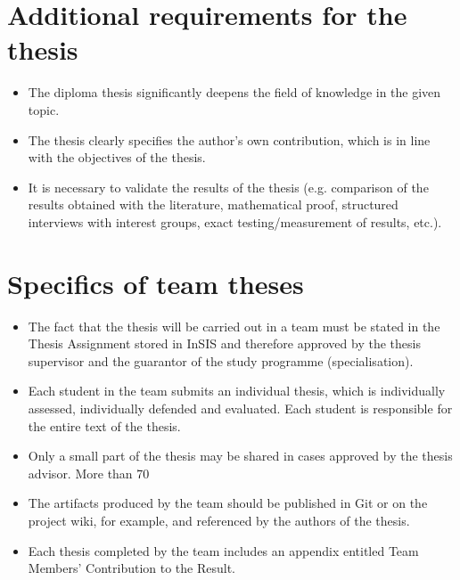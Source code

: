 \section*{Additional requirements for the thesis}
\begin{itemize}
\item \vspace*{-2ex}The diploma thesis significantly deepens the field of knowledge in the given topic.
\item The thesis clearly specifies the author's own contribution, which is in line with the objectives of the thesis. 
\item It is necessary to validate the results of the thesis (e.g. comparison of the results obtained with the literature, mathematical proof, structured interviews with interest groups, exact testing/measurement of results, etc.).
\end{itemize}

\section*{Specifics of team theses}
\begin{itemize}
\item \vspace*{-2ex}The fact that the thesis will be carried out in a team must be stated in the Thesis Assignment stored in InSIS and therefore approved by the thesis supervisor and the guarantor of the study programme (specialisation).
\item Each student in the team submits an individual thesis, which is individually assessed, individually defended and evaluated. Each student is responsible for the entire text of the thesis.
\item Only a small part of the thesis may be shared in cases approved by the thesis advisor. More than 70%
\item The artifacts produced by the team should be published in Git or on the project wiki, for example, and referenced by the authors of the thesis.
\item Each thesis completed by the team includes an appendix entitled Team Members' Contribution to the Result.
\end{itemize}
